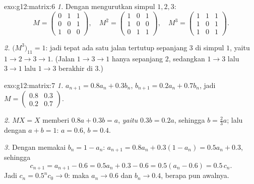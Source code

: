 \begin{solution}{exo:g12:matrix:6}
\emph{1.} Dengan mengurutkan simpul $1, 2, 3$:
\[
M = \begin{pmatrix} 0&1&1\\ 0&0&1\\ 1&0&0\end{pmatrix}, \quad
M^2 = \begin{pmatrix} 1&0&1\\ 1&0&0\\ 0&1&1\end{pmatrix}, \quad
M^3 = \begin{pmatrix} 1&1&1\\ 1&0&1\\ 1&0&1 \end{pmatrix}.
\]

\emph{2.} $\bigl(M^3\bigr)_{11} = 1$: jadi tepat ada satu jalan tertutup sepanjang $3$
di simpul $1$, yaitu $1 \to 2 \to 3 \to 1$. (Jalan
$1 \to 3 \to 1$ hanya sepanjang $2$, sedangkan $1 \to 3$ lalu $3\to1$ lalu
$1\to3$ berakhir di $3$.)
\end{solution}

\begin{solution}{exo:g12:matrix:7}
\emph{1.} $a_{n+1} = 0.8a_n + 0.3b_n$, $b_{n+1} = 0.2a_n + 0.7b_n$, jadi
$M = \begin{pmatrix} 0.8 & 0.3\\ 0.2 & 0.7\end{pmatrix}$.

\emph{2.} $MX = X$ memberi $0.8a + 0.3b = a$, \emph{yaitu} $0.3b = 0.2a$, sehingga
$b = \frac23 a$; lalu dengan $a + b = 1$: $a = 0.6$, $b = 0.4$.

\emph{3.} Dengan memakai $b_n = 1 - a_n$:
$a_{n+1} = 0.8a_n + 0.3(1 - a_n) = 0.5a_n + 0.3$, sehingga
\[
c_{n+1} = a_{n+1} - 0.6 = 0.5a_n + 0.3 - 0.6 = 0.5(a_n - 0.6) = 0.5\,c_n .
\]
Jadi $c_n = 0.5^n c_0 \to 0$: maka $a_n \to 0.6$ dan $b_n \to 0.4$, berapa pun
 awalnya.
\end{solution}

